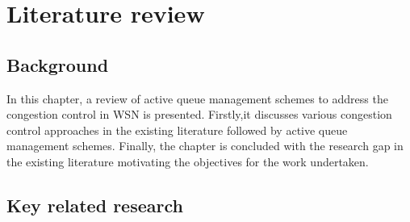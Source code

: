 \chapter{Literature review}
\label{mathchapter}
\section{Background}
In this chapter, a review of active queue management schemes to address the congestion control in WSN is presented. Firstly,it discusses various congestion control approaches in the existing literature followed by active queue management schemes. Finally, the chapter is concluded with the research gap in the existing literature motivating the objectives for the work undertaken.
\section{Key related research}
